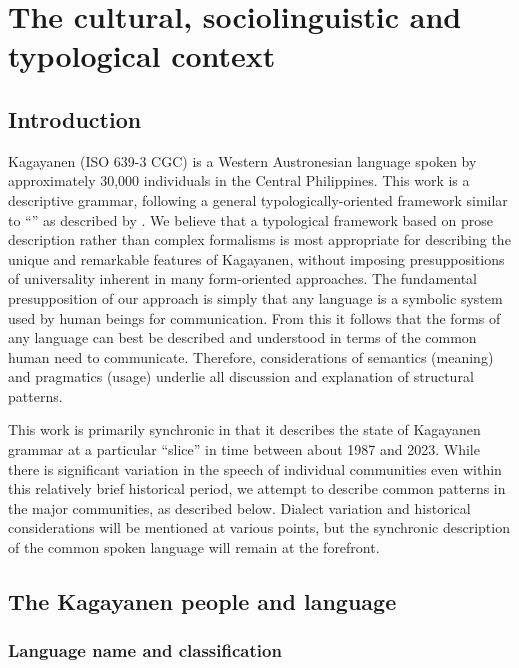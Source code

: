 \chapter{The cultural, sociolinguistic and typological context}\label{chap:1}
\section{Introduction}\label{sec:introduction-1}

Kagayanen (ISO 639-3 CGC) is a Western Austronesian language spoken by approximately 30,000 individuals in the Central Philippines. This work is a descriptive grammar, following a general typologically-oriented framework similar to “” as described by \citet{dixon2010a, dixon2010b}. We believe that a typological framework based on prose description rather than complex formalisms is most appropriate for describing the unique and remarkable features of Kagayanen, without imposing presuppositions of universality inherent in many form-oriented approaches. The fundamental presupposition of our approach is simply that any language is a symbolic system used by human beings for communication. From this it follows that the forms of any language can best be described and understood in terms of the common human need to communicate. Therefore, considerations of semantics (meaning) and pragmatics (usage) underlie all discussion and explanation of structural patterns.

This work is primarily synchronic in that it describes the state of Kagayanen grammar at a particular “slice” in time between about 1987 and 2023. While there is significant variation in the speech of individual communities even within this relatively brief historical period, we attempt to describe common patterns in the major communities, as described below. Dialect variation and historical considerations will be mentioned at various points, but the synchronic description of the common spoken language will remain at the forefront.

\section{The Kagayanen people and language}\label{sec:1.2} \label{sec:peopleandlanguage}
\subsection{Language name and classification}\label{sec:1.2.1} \label{sec:languagenameandclassification}

